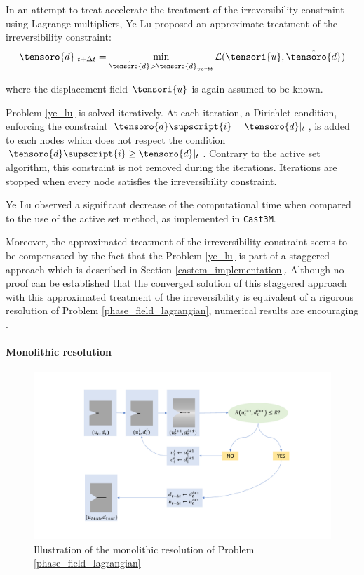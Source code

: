 In an attempt to treat accelerate the treatment of the irreversibility
constraint using Lagrange multipliers, Ye Lu proposed an approximate
treatment of the irreversibility constraint:
\begin{equation}
    \label{ye_lu}
    \tensoro{d}\vert_{t + \Delta t}
    =
    \min_{\hat{\tensoro{d}} > \tensoro{d}_{vert{t}}}
    \mathcal{L}(\tensori{u}, \hat{\tensoro{d}})
\end{equation}

where the displacement field $\tensori{u}$ is again assumed to be known.

Problem \eqref{ye_lu} is solved iteratively. At each iteration,
a Dirichlet condition, enforcing the constraint
$\tensoro{d}\supscript{i} = \tensoro{d}\vert_{t}$, is
added to each nodes which does not respect the condition
$\tensoro{d}\supscript{i} \geq \tensoro{d}\vert_{t}$. Contrary to the active set algorithm, this
constraint is not removed during the iterations. Iterations are stopped
when every node satisfies the irreversibility constraint.

Ye Lu observed a significant decrease of the computational time when
compared to the use of the active set method, as implemented in
\texttt{Cast3M}.

Moreover, the approximated treatment of the irreversibility constraint
seems to be compensated by the fact that the Problem
\ref{ye_lu} is part of a staggered approach which is described
in Section \ref{castem_implementation}. Although no proof can
be established that the converged solution of this staggered approach
with this approximated treatment of the irreversibility is equivalent of
a rigorous resolution of Problem \ref{phase_field_lagrangian}, numerical
results are encouraging \cite{lu_schema_2019}.

\paragraph{Monolithic resolution}

\begin{figure}[h!]
    \centering
    \includegraphics[width=7.cm]{img/monolithic-resolution.pdf}
    \caption{Illustration of the monolithic resolution of Problem \ref{phase_field_lagrangian}}
    \label{phase-field}
\end{figure}

